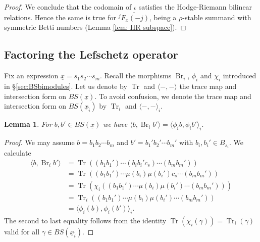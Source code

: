 \documentclass[11pt]{amsart}
\numberwithin{equation}{section}
\def\g{\gamma}
\DeclareMathOperator{\Tr}{Tr}
\def\un{\underline}
\DeclareMathOperator{\Br}{Br}
\newtheorem{lem}[thm]{Lemma}
\theoremstyle{definition}
\theoremstyle{remark}
\newtheorem{remark}[thm]{Remark}
\begin{document}
{\begin{proof}
We conclude that the codomain of $\iota$ satisfies the Hodge-Riemann
bilinear relations. Hence the same is true for 
$\overline{{}^jF_x(-j)}$,  being a $\rho$-stable summand with symmetric
Betti numbers (Lemma \ref{lem: HR subspace}).
\end{proof}



\subsection{Factoring the Lefschetz operator} \label{sec:fact-lefsch-oper}

Fix an expression $\un{x} = s_1s_2 \cdots s_m$. Recall the
morphisms $\Br_i$, $\phi_i$ and $\chi_i$ introduced in
\S\ref{sec:BSbimodules}. Let us denote by $\Tr$ and $\langle -, -
\rangle$ the trace 
map and intersection form on $BS(\un{x})$. To avoid confusion, we
denote the trace map and intersection form on $BS(\un{x}_{\widehat{i}})$
by $\Tr_i$ and $\langle -, - \rangle_i$.

\begin{lem} \label{lem: breaking lefschetz II}
  For $b, b' \in BS(\un{x})$ we have $\langle b, \Br_i b' \rangle = \langle \phi_i b, \phi_i b' \rangle_i.$
\end{lem}

\begin{proof}
  We may assume $b = b_1b_2 \cdots b_m$ and $b' = b_1'b_2' \cdots b_m'$
  with $b_i, b_i' \in B_{s_i}$. We calculate
\begin{align*}
\langle b, \Br_i b' \rangle &= \Tr((b_1b_1') \cdots (b_ib_i'c_s) \cdots
(b_mb_m')) \\
& = \Tr((b_1b_1') \cdots \mu(b_i)\mu(b_i')c_s \cdots (b_mb_m')) \\
& = \Tr( \chi_i( (b_1b_1') \cdots \mu(b_i)\mu(b_i') \cdots (b_mb_m'))) \\
& = \Tr_i((b_1b_1') \cdots \mu(b_i)\mu(b_i') \cdots (b_mb_m')) \\
& = \langle \phi_i(b), \phi_i(b') \rangle_i.
\end{align*}
The second to last equality follows from the identity $\Tr(\chi_i(\g)) =
\Tr_i(\g)$ valid for all $\g \in BS(\un{x}_{\widehat{i}})$.
\end{proof}

}
\end{document}
